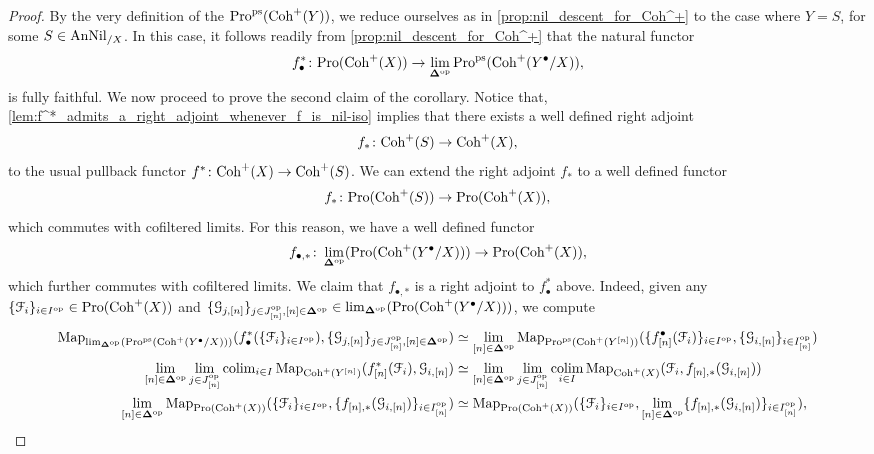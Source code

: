 \documentclass[10pt,a4paper,reqno]{amsart} %
\theoremstyle{plain}
\theoremstyle{definition}
\theoremstyle{remark}
\numberwithin{equation}{section}
\begin{document}
\begin{proof}
    By the very definition of the \infcat $\mathrm{Pro}^\mathrm{ps}(\mathrm{Coh}^+(Y))$, we reduce ourselves as in
    \cref{prop:nil_descent_for_Coh^+} to the case where $Y = S$, for some $S \in \mathrm{AnNil}_{/X}$. In this case, it follows readily from
    \cref{prop:nil_descent_for_Coh^+} that the natural functor
        \[
            f_\bullet^* \colon \mathrm{Pro}(\mathrm{Coh}^+(X)) \to \lim_{\bm{\Delta} ^\mathrm{op}} \mathrm{Pro}^\mathrm{ps}(\mathrm{Coh}^+(Y^\bullet/X)),  
        \]
    is fully faithful. We now proceed to prove the second claim of the corollary. Notice that,
    \cref{lem:f^*_admits_a_right_adjoint_whenever_f_is_nil-iso} implies that there exists a well defined right adjoint
        \[
            f_* \colon \mathrm{Coh}^+(S) \to \mathrm{Coh}^+(X),  
        \]
    to the usual pullback functor $f^* \colon \mathrm{Coh}^+(X) \to \mathrm{Coh}^+(S)$. We can extend the right adjoint $f_*$ to a well defined functor
        \[
            f_* \colon \mathrm{Pro}(\mathrm{Coh}^+(S)) \to \mathrm{Pro}(\mathrm{Coh}^+(X)),  
        \]
    which commutes with cofiltered limits. For this reason, we have a well defined functor
        \[
            f_{\bullet, *} \colon \lim_{\bm{\Delta}^\mathrm{op}}(\mathrm{Pro}(\mathrm{Coh}^+(Y^\bullet/X))) \to \mathrm{Pro}(\mathrm{Coh}^+(X)),  
        \]
    which further commutes with cofiltered limits. We claim that $ f_{\bullet, *}$ is a right adjoint to $f_\bullet^*$ above. Indeed, given
    any $\{ \mathcal F_i \}_{i \in I^\mathrm{op}}  \in \mathrm{Pro}(\mathrm{Coh}^+(X))$ and $\{ \mathcal G_{j, [n]} \}_{j \in J_{[n]} ^\mathrm{op}, [n] \in \bm{\Delta} ^\mathrm{op}} \in \lim_{\bm{\Delta} ^\mathrm{op}}(\mathrm{Pro}(\mathrm{Coh}^+(Y^\bullet/X)))$,
    we compute
        \begin{align*}
            \operatorname{Map}_{\lim_{\bm{\Delta} ^\mathrm{op}}(\mathrm{Pro}^\mathrm{ps}(\mathrm{Coh}^+(Y^\bullet/X)))}( f_\bullet^*( \{ \mathcal F_i \}_{i \in I^\mathrm{op}}), \{ \mathcal G_{j, [n]} \}_{j \in J^\mathrm{op}_{[n]}, [n] \in \bm{\Delta} ^\mathrm{op}}) & \simeq \lim_{[n] \in \bm{\Delta} ^\mathrm{op}} \operatorname{Map}_{\mathrm{Pro}^\mathrm{ps}(\mathrm{Coh}^+(Y^{[n]}))} ( \{f_{[n]}^\bullet(\mathcal F_i) \}_{i \in I^\mathrm{op}},  \{ \mathcal G_{i, [n]} \}_{i \in I^\mathrm{op}_{[n]}}) \\
            \lim_{[n] \in \bm{\Delta} ^\mathrm{op}} \lim_{j \in J^\mathrm{op}_{[n]}} \mathrm{colim}_{i \in I} \operatorname{Map}_{\mathrm{Coh}^+(Y^{[n]})} ( f_{[n]}^*(\mathcal F_i),   \mathcal G_{i, [n]}) & \simeq \lim_{[n] \in \bm{\Delta} ^\mathrm{op}} \lim_{j \in J^\mathrm{op}_{[n]}} \operatorname*{colim}_{i \in I} \operatorname{Map}_{\mathrm{Coh}^+(X)} (\mathcal F_i, f_{[n], *}(\mathcal G_{i, [n]})) \\
            \lim_{[n] \in \bm{\Delta} ^\mathrm{op}} \operatorname{Map}_{\mathrm{Pro}(\mathrm{Coh}^+(X))}( \{\mathcal F_i\}_{i \in I^\mathrm{op}}, \{f_{[n], *}(\mathcal G_{i, [n]}) \}_{i \in I_{[n]} ^\mathrm{op}}) & \simeq \operatorname{Map}_{\mathrm{Pro}(\mathrm{Coh}^+(X))}( \{\mathcal F_i\}_{i \in I^\mathrm{op}}, \lim_{[n] \in \bm{\Delta} ^\mathrm{op}} \{f_{[n], *}(\mathcal G_{i, [n]}) \}_{i \in I_{[n]} ^\mathrm{op}}),
        \end{align*}

\end{proof}
\end{document}
